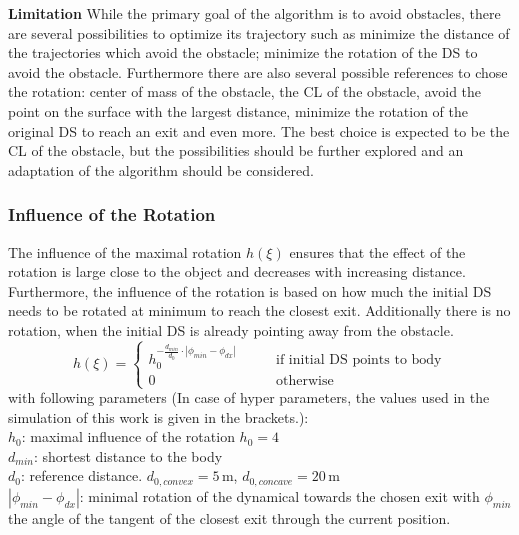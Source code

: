 \textbf{Limitation}
While the primary goal of the algorithm is to avoid obstacles, there are several possibilities to optimize its trajectory such as minimize the distance of the trajectories which avoid the obstacle; minimize the rotation of the DS to avoid the obstacle. Furthermore there are also several possible references to chose the rotation: center of mass of the obstacle, the CL of the obstacle, avoid the point on the surface with the largest distance, minimize the rotation of the original DS to reach an exit and even more. The best choice is expected to be the CL of the obstacle, but the possibilities should be further explored and an adaptation of the algorithm should be considered.

\subsubsection{Influence of the Rotation}
The influence of the maximal rotation $h(\xi)$ ensures that the effect of the rotation is large close to the object and decreases with increasing distance. Furthermore, the influence of the rotation is based on how much the initial DS needs to be rotated at minimum to reach the closest exit. Additionally there is no rotation, when the initial DS is already pointing away from the obstacle.
\begin{equation}
h(\xi ) =
\begin{cases}
h_0 ^{- \frac{d_{min}}{d_0} \cdot \left|\phi_{min}-\phi_{dx} \right|} \qquad &\text{if initial DS points to body} \\
0 \qquad &\text{otherwise}
\end{cases}
\end{equation}
with following parameters (In case of hyper parameters, the values used in the simulation of this work is given in the brackets.): \\
$h_0$: maximal influence of the rotation $h_0 = 4$\\
$d_{min}$: shortest distance to the body \\
$d_0$: reference distance. $d_{0,convex} = 5 \,\mathrm{m}$, $d_{0,concave} = 20 \, \mathrm{m}$ \\
$| \phi_{min}- \phi_{dx} |$:  minimal rotation of the dynamical towards the chosen exit with $\phi_{min}$ the angle of the tangent of the closest exit through the current position. \\

